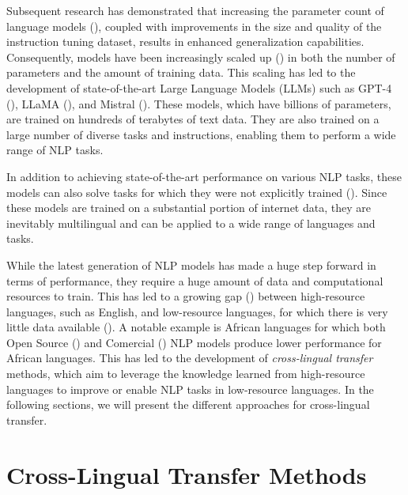 Subsequent research has demonstrated that increasing the parameter count of language models (\citep{brown2020language}), coupled with improvements in the size and quality of the instruction tuning dataset, results in enhanced generalization capabilities. Consequently, models have been increasingly scaled up (\cite{chung-flan-instruction-models}) in both the number of parameters and the amount of training data. This scaling has led to the development of state-of-the-art Large Language Models (LLMs) such as GPT-4 (\cite{openai2024gpt4technicalreport}), LLaMA (\cite{DBLP:journals/corr/abs-2407-21783}), and Mistral (\cite{jiang2023mistral7b}). These models, which have billions of parameters, are trained on hundreds of terabytes of text data. They are also trained on a large number of diverse tasks and instructions, enabling them to perform a wide range of NLP tasks.

In addition to achieving state-of-the-art performance on various NLP tasks, these models can also solve tasks for which they were not explicitly trained (\cite{radford2019language,lieber2021jurassic,DBLP:journals/corr/abs-2201-11990,rae2022scalinglanguagemodelsmethods,DBLP:journals/jmlr/ChowdheryNDBMRBCSGSSTMRBTSPRDHPBAI23}). Since these models are trained on a substantial portion of internet data, they are inevitably multilingual and can be applied to a wide range of languages and tasks.

While the latest generation of NLP models has made a huge step forward in terms of performance, they require a huge amount of data and computational resources to train. This has led to a growing gap (\cite{blasi-etal-2022-systematic}) between high-resource languages, such as English, and low-resource languages, for which there is very little data available (\cite{joshi-etal-2020-state}). A notable example is African languages for which both Open Source (\cite{DBLP:journals/corr/abs-2311-07978}) and Comercial (\cite{DBLP:conf/africanlp/OjoO23}) NLP models produce lower performance for African languages. This has led to the development of \emph{cross-lingual transfer} methods, which aim to leverage the knowledge learned from high-resource languages to improve or enable NLP tasks in low-resource languages. In the following sections, we will present the different approaches for cross-lingual transfer.

\section{Cross-Lingual Transfer Methods}
\label{sc:transfer-methods}

